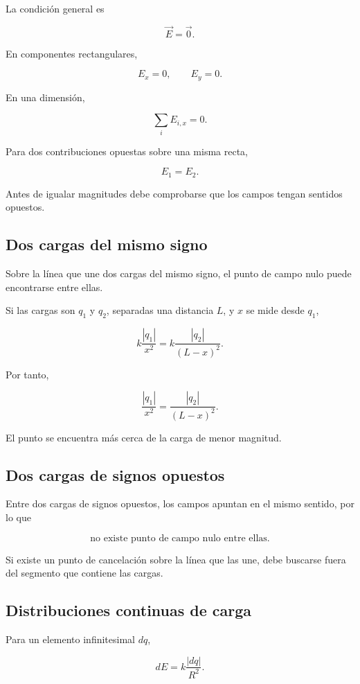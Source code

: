 La condición general es

\[
\boxed{\vec E=\vec 0}.
\]

En componentes rectangulares,

\[
\boxed{E_x=0},
\qquad
\boxed{E_y=0}.
\]

En una dimensión,

\[
\boxed{\sum_iE_{i,x}=0}.
\]

Para dos contribuciones opuestas sobre una misma recta,

\[
\boxed{E_1=E_2}.
\]

Antes de igualar magnitudes debe comprobarse que los campos tengan sentidos opuestos.


\subsection{Dos cargas del mismo signo}

Sobre la línea que une dos cargas del mismo signo, el punto de campo nulo puede encontrarse entre ellas.

Si las cargas son \(q_1\) y \(q_2\), separadas una distancia \(L\), y \(x\) se mide desde \(q_1\),

\[
k\frac{|q_1|}{x^2}
=
k\frac{|q_2|}{(L-x)^2}.
\]

Por tanto,

\[
\boxed{
\frac{|q_1|}{x^2}
=
\frac{|q_2|}{(L-x)^2}
}.
\]

El punto se encuentra más cerca de la carga de menor magnitud.


\subsection{Dos cargas de signos opuestos}

Entre dos cargas de signos opuestos, los campos apuntan en el mismo sentido, por lo que

\[
\boxed{\text{no existe punto de campo nulo entre ellas}}.
\]

Si existe un punto de cancelación sobre la línea que las une, debe buscarse fuera del segmento que contiene las cargas.


\subsection{Distribuciones continuas de carga}

Para un elemento infinitesimal \(dq\),

\[
\boxed{dE=k\frac{|dq|}{R^2}}.
\]

